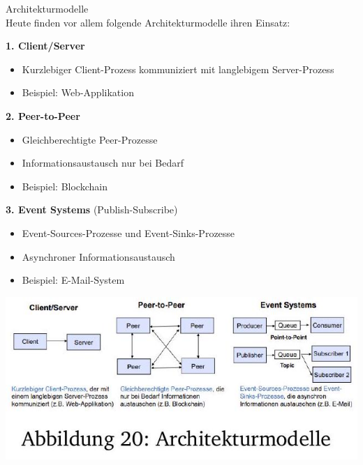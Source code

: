 \begin{definition}{Architekturmodelle}\\
Heute finden vor allem folgende Architekturmodelle ihren Einsatz:

\textbf{1. Client/Server}
\begin{itemize}
    \item Kurzlebiger Client-Prozess kommuniziert mit langlebigem Server-Prozess
    \item Beispiel: Web-Applikation
\end{itemize}

\textbf{2. Peer-to-Peer}
\begin{itemize}
    \item Gleichberechtigte Peer-Prozesse
    \item Informationsaustausch nur bei Bedarf
    \item Beispiel: Blockchain
\end{itemize}

\textbf{3. Event Systems} (Publish-Subscribe)
\begin{itemize}
    \item Event-Sources-Prozesse und Event-Sinks-Prozesse
    \item Asynchroner Informationsaustausch
    \item Beispiel: E-Mail-System
\end{itemize}
\includegraphics[width=0.9\linewidth]{images/2024_12_29_0d1d7b5551ea1b4b41bdg-18}
\end{definition}



